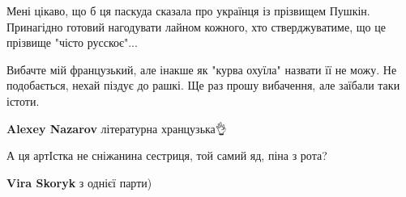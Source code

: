 \begin{itemize}
 

Мені цікаво, що б ця паскуда сказала про українця із прізвищем Пушкін.
Принагідно готовий нагодувати лайном кожного, хто стверджуватиме, що це
прізвище "чісто русскоє"...

 

Вибачте мій французький, але інакше як "курва охуїла" назвати її не можу. Не
подобається, нехай піздує до рашкі. Ще раз прошу вибачення, але заїбали таки
істоти.

\begin{itemize}
 
\textbf{Alexey Nazarov} літературна хранцузька👌
\end{itemize}

 
А ця артІстка не сніжанина сестриця, той самий яд, піна з рота?

\begin{itemize}
 
\textbf{Vira Skoryk} з однієї парти)
\end{itemize}

 

\end{itemize}
